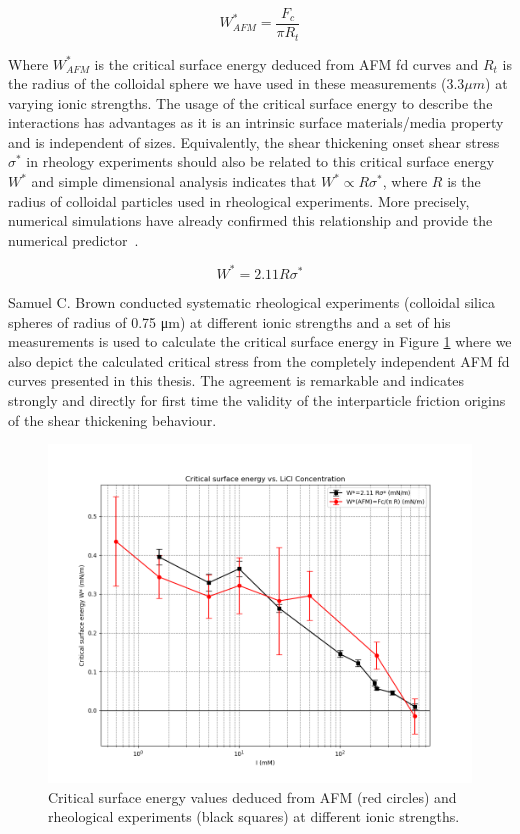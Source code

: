 \[ W^*_{AFM} = \frac{F_c}{\pi R_t} \]

Where $W^*_{AFM}$ is the critical surface energy deduced from AFM fd curves and $R_t$ is the radius of the colloidal sphere we have used in these measurements ($3.3 \mu m$) at varying ionic strengths. The usage of the critical surface energy to describe the interactions has advantages as it is an intrinsic surface materials/media property and is independent of sizes. Equivalently, the shear thickening onset shear stress $\sigma^*$ in rheology experiments should also be related to this critical surface energy $W^*$ and simple dimensional analysis indicates that $W^* \propto R\sigma^*$, where $R$ is the radius of colloidal particles used in rheological experiments. More precisely, numerical simulations have already confirmed this relationship and provide the numerical predictor~\cite{reference4}.

\[ W^* = 2.11 R\sigma^* \]

Samuel C. Brown conducted systematic rheological experiments (colloidal silica spheres of radius of 0.75 μm) at different ionic strengths and a set of his measurements is used to calculate the critical surface energy in Figure \ref{fig:critical_surface_energy} where we also depict the calculated critical stress from the completely independent AFM fd curves presented in this thesis. The agreement is remarkable and indicates strongly and directly for first time the validity of the interparticle friction origins of the shear thickening behaviour.

\begin{figure}[h!]
\centering
\includegraphics[width=\textwidth]{chapter8/Rheology/Comparison graph.png}
\caption{Critical surface energy values deduced from AFM (red circles) and rheological experiments (black squares) at different ionic strengths.}
\label{fig:critical_surface_energy}
\end{figure}


